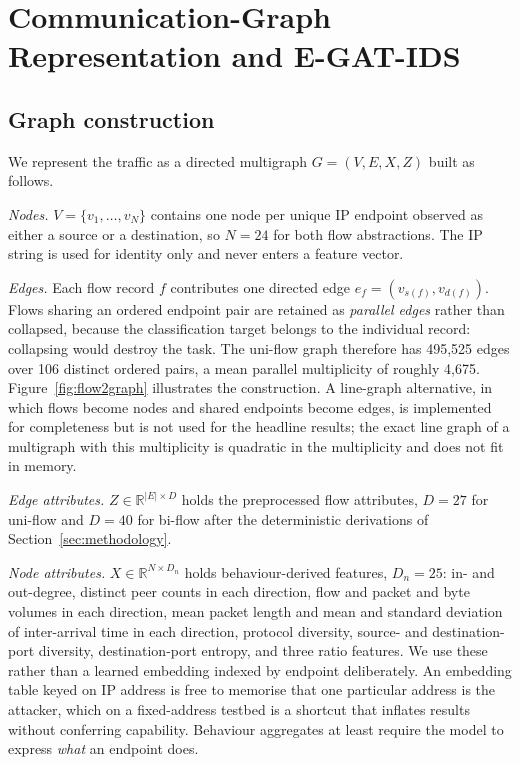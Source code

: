 \section{Communication-Graph Representation and E-GAT-IDS}
\label{sec:method}

\subsection{Graph construction}

We represent the traffic as a directed multigraph
$G = (V, E, X, Z)$ built as follows.

\emph{Nodes.} $V = \{v_1,\dots,v_N\}$ contains one node per unique IP endpoint
observed as either a source or a destination, so $N = 24$ for both flow
abstractions. The IP string is used for identity only and never enters a
feature vector.

\emph{Edges.} Each flow record $f$ contributes one directed edge
$e_f = (v_{s(f)}, v_{d(f)})$. Flows sharing an ordered endpoint pair are
retained as \emph{parallel edges} rather than collapsed, because the
classification target belongs to the individual record: collapsing would
destroy the task. The uni-flow graph therefore has 495{,}525 edges over 106
distinct ordered pairs, a mean parallel multiplicity of roughly 4{,}675.
Figure~\ref{fig:flow2graph} illustrates the construction. A line-graph
alternative, in which flows become nodes and shared endpoints become edges, is
implemented for completeness but is not used for the headline results; the
exact line graph of a multigraph with this multiplicity is quadratic in the
multiplicity and does not fit in memory.

\emph{Edge attributes.} $Z \in \mathbb{R}^{|E| \times D}$ holds the
preprocessed flow attributes, $D = 27$ for uni-flow and $D = 40$ for bi-flow
after the deterministic derivations of Section~\ref{sec:methodology}.

\emph{Node attributes.} $X \in \mathbb{R}^{N \times D_n}$ holds
behaviour-derived features, $D_n = 25$: in- and out-degree, distinct peer
counts in each direction, flow and packet and byte volumes in each direction,
mean packet length and mean and standard deviation of inter-arrival time in
each direction, protocol diversity, source- and destination-port diversity,
destination-port entropy, and three ratio features. We use these rather than a
learned embedding indexed by endpoint deliberately. An embedding table keyed on
IP address is free to memorise that one particular address is the attacker,
which on a fixed-address testbed is a shortcut that inflates results without
conferring capability. Behaviour aggregates at least require the model to
express \emph{what} an endpoint does.

